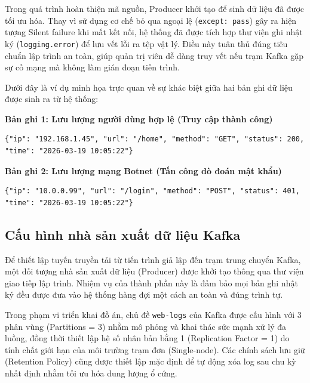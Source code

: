 \documentclass[12pt,a4paper]{report}
\begin{document}
Trong quá trình hoàn thiện mã nguồn, Producer khởi tạo để sinh dữ liệu đã được tối ưu hóa. Thay vì sử dụng cơ chế bỏ qua ngoại lệ (\texttt{except: pass}) gây ra hiện tượng Silent failure khi mất kết nối, hệ thống đã được tích hợp thư viện ghi nhật ký (\texttt{logging.error}) để lưu vết lỗi ra tệp vật lý. Điều này tuân thủ đúng tiêu chuẩn lập trình an toàn, giúp quản trị viên dễ dàng truy vết nếu trạm Kafka gặp sự cố mạng mà không làm gián đoạn tiến trình.

Dưới đây là ví dụ minh họa trực quan về sự khác biệt giữa hai bản ghi dữ liệu được sinh ra từ hệ thống:


\vspace{0.5cm}
\noindent \textbf{Bản ghi 1: Lưu lượng người dùng hợp lệ (Truy cập thành công)}
\begin{lstlisting}
{"ip": "192.168.1.45", "url": "/home", "method": "GET", "status": 200, "time": "2026-03-19 10:05:22"}
\end{lstlisting}

\noindent \textbf{Bản ghi 2: Lưu lượng mạng Botnet (Tấn công dò đoán mật khẩu)}
\begin{lstlisting}
{"ip": "10.0.0.99", "url": "/login", "method": "POST", "status": 401, "time": "2026-03-19 10:05:22"}
\end{lstlisting}

\subsection{Cấu hình nhà sản xuất dữ liệu Kafka}
Để thiết lập tuyến truyền tải từ tiến trình giả lập đến trạm trung chuyển Kafka, một đối tượng nhà sản xuất dữ liệu (Producer) được khởi tạo thông qua thư viện giao tiếp lập trình. Nhiệm vụ của thành phần này là đảm bảo mọi bản ghi nhật ký đều được đưa vào hệ thống hàng đợi một cách an toàn và đúng trình tự.

Trong phạm vi triển khai đồ án, chủ đề \texttt{web-logs} của Kafka được cấu hình với 3 phân vùng (Partitions = 3) nhằm mô phỏng và khai thác sức mạnh xử lý đa luồng, đồng thời thiết lập hệ số nhân bản bằng 1 (Replication Factor = 1) do tính chất giới hạn của môi trường trạm đơn (Single-node). Các chính sách lưu giữ (Retention Policy) cũng được thiết lập mặc định để tự động xóa log sau chu kỳ nhất định nhằm tối ưu hóa dung lượng ổ cứng.
\end{document}

